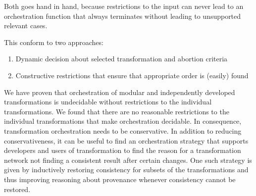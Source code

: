 Both goes hand in hand, because restrictions to the input can never lead to an orchestration function that always terminates without leading to unsupported relevant cases.

This conform to two approaches:
\begin{enumerate}
    \item Dynamic decision about selected transformation and abortion criteria
    \item Constructive restrictions that ensure that appropriate order is (easily) found
\end{enumerate}



\begin{insight}[Orchestration]
    We have proven that orchestration of modular and independently developed transformations is undecidable without restrictions to the individual transformations.
    We found that there are no reasonable restrictions to the individual transformations that make orchestration decidable.
    In consequence, transformation orchestration needs to be conservative.
    In addition to reducing conservativeness, it can be useful to find an orchestration strategy that supports developers and users of transformation to find the reason for a transformation network not finding a consistent result after certain changes.
    One such strategy is given by inductively restoring consistency for subsets of the transformations and thus improving reasoning about provenance whenever consistency cannot be restored.
\end{insight}